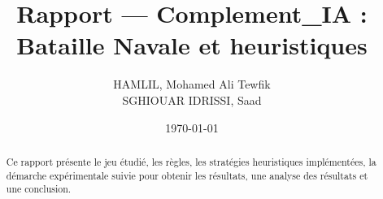 \documentclass[11pt,a4paper]{article}
\title{Rapport — Complement\_IA : Bataille Navale et heuristiques}
\author{%
	HAMLIL, Mohamed Ali Tewfik \\%
	SGHIOUAR IDRISSI, Saad
}
\date{\today}
\begin{document}
\maketitle
\begin{abstract}
Ce rapport présente le jeu étudié, les règles, les stratégies heuristiques implémentées, la démarche expérimentale suivie pour obtenir les résultats, une analyse des résultats et une conclusion.
\end{abstract}

\tableofcontents
\clearpage








\clearpage
\nocite{*}


\end{document}

